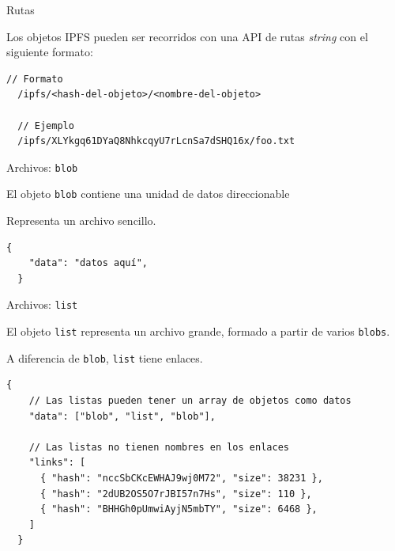 \documentclass[spanish]{beamer}
\begin{document}
\begin{frame}[fragile]{Rutas}

  Los objetos IPFS pueden ser recorridos con una API de rutas \textit{string} con el siguiente formato:

  \begin{lstlisting}[caption={Rutas en IPFS.}]
  // Formato
  /ipfs/<hash-del-objeto>/<nombre-del-objeto>

  // Ejemplo
  /ipfs/XLYkgq61DYaQ8NhkcqyU7rLcnSa7dSHQ16x/foo.txt
\end{lstlisting}

\end{frame}

\begin{frame}[fragile]{Archivos: \texttt{blob}}

  El objeto \texttt{blob} contiene una unidad de datos direccionable

  Representa un archivo sencillo.

  \begin{lstlisting}[caption={Estructura JSON de un \texttt{blob}.}]
  {
    "data": "datos aquí",
  }
\end{lstlisting}

\end{frame}

\begin{frame}[fragile]{Archivos: \texttt{list}}

  El objeto \texttt{list} representa un archivo grande, formado a partir de varios \texttt{blobs}.

  A diferencia de \texttt{blob}, \texttt{list} tiene enlaces.

  
\begin{lstlisting}[caption={Estructura JSON de un \texttt{list}.}]
  {
    // Las listas pueden tener un array de objetos como datos
    "data": ["blob", "list", "blob"],

    // Las listas no tienen nombres en los enlaces
    "links": [
      { "hash": "nccSbCKcEWHAJ9wj0M72", "size": 38231 },
      { "hash": "2dUB2OS5O7rJBI57n7Hs", "size": 110 },
      { "hash": "BHHGh0pUmwiAyjN5mbTY", "size": 6468 },
    ]
  }
\end{lstlisting}

\end{frame}
\end{document}

